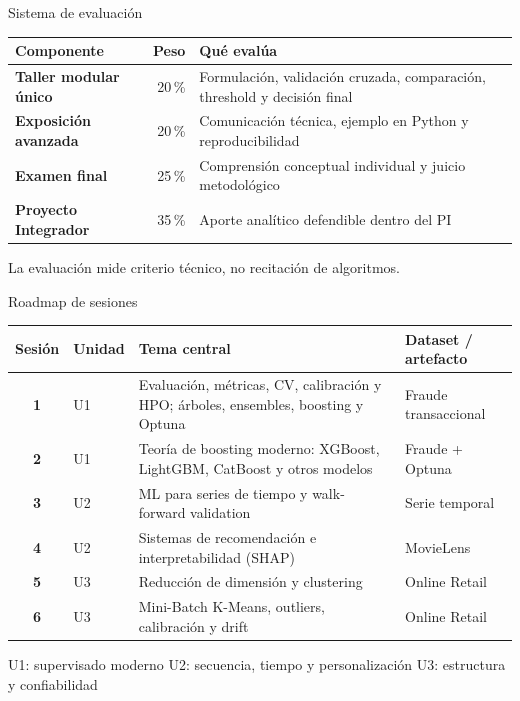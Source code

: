 \documentclass[aspectratio=169,12pt]{beamer}
\newcommand{\hrow}{\rowcolor{mlcream}}
\begin{document}
\begin{frame}{Sistema de evaluación}
  \centering\footnotesize
  \begin{tabular}{@{}l r L{0.58\textwidth}@{}}
    \toprule
    \hrow \textbf{Componente} & Peso & Qué evalúa \\
    \midrule
    \textbf{Taller modular único} & 20\,\% & Formulación, validación cruzada, comparación, threshold y decisión final \\
    \textbf{Exposición avanzada} & 20\,\% & Comunicación técnica, ejemplo en Python y reproducibilidad \\
    \textbf{Examen final} & 25\,\% & Comprensión conceptual individual y juicio metodológico \\
    \textbf{Proyecto Integrador} & 35\,\% & Aporte analítico defendible dentro del PI \\
    \bottomrule
  \end{tabular}
  \vspace{6pt}
  \begin{keybox}[Criterio]
    \small La evaluación mide criterio técnico, no recitación de algoritmos.
  \end{keybox}
\end{frame}

\begin{frame}{Roadmap de sesiones}
  \centering\footnotesize
  \begin{tabular}{@{}c l L{0.5\textwidth} L{0.22\textwidth}@{}}
    \toprule
    \hrow \textbf{Sesión} & Unidad & Tema central & Dataset / artefacto \\
    \midrule
    \textbf{1} & U1 & Evaluación, métricas, CV, calibración y HPO; árboles, ensembles, boosting y Optuna & Fraude transaccional \\
    \textbf{2} & U1 & Teoría de boosting moderno: XGBoost, LightGBM, CatBoost y otros modelos & Fraude + Optuna \\
    \textbf{3} & U2 & ML para series de tiempo y walk-forward validation & Serie temporal \\
    \textbf{4} & U2 & Sistemas de recomendación e interpretabilidad (SHAP) & MovieLens \\
    \textbf{5} & U3 & Reducción de dimensión y clustering & Online Retail \\
    \textbf{6} & U3 & Mini-Batch K-Means, outliers, calibración y drift & Online Retail \\
    \bottomrule
  \end{tabular}
  \vspace{2pt}

  \scriptsize U1: supervisado moderno \quad U2: secuencia, tiempo y personalización \quad U3: estructura y confiabilidad
\end{frame}
\end{document}
